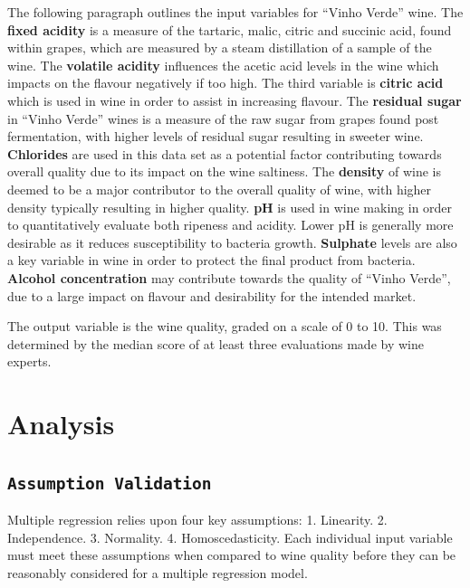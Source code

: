\documentclass[letterpaper,8pt,twocolumn,twoside,]{pinp}
\begin{document}
The following paragraph outlines the input variables for ``Vinho Verde''
wine. The \textbf{fixed acidity} is a measure of the tartaric, malic,
citric and succinic acid, found within grapes, which are measured by a
steam distillation of a sample of the wine. The \textbf{volatile
acidity} influences the acetic acid levels in the wine which impacts on
the flavour negatively if too high. The third variable is \textbf{citric
acid} which is used in wine in order to assist in increasing flavour.
The \textbf{residual sugar} in ``Vinho Verde'' wines is a measure of the
raw sugar from grapes found post fermentation, with higher levels of
residual sugar resulting in sweeter wine. \textbf{Chlorides} are used in
this data set as a potential factor contributing towards overall quality
due to its impact on the wine saltiness. The \textbf{density} of wine is
deemed to be a major contributor to the overall quality of wine, with
higher density typically resulting in higher quality. \textbf{pH} is
used in wine making in order to quantitatively evaluate both ripeness
and acidity. Lower pH is generally more desirable as it reduces
susceptibility to bacteria growth. \textbf{Sulphate} levels are also a
key variable in wine in order to protect the final product from
bacteria. \textbf{Alcohol concentration} may contribute towards the
quality of ``Vinho Verde'', due to a large impact on flavour and
desirability for the intended market.

The output variable is the wine quality, graded on a scale of 0 to 10.
This was determined by the median score of at least three evaluations
made by wine experts.

\hypertarget{analysis}{%
\section{Analysis}\label{analysis}}

\hypertarget{assumption-validation}{%
\subsection{\texorpdfstring{\texttt{Assumption\ Validation}}{Assumption Validation}}\label{assumption-validation}}

Multiple regression relies upon four key assumptions: 1. Linearity. 2.
Independence. 3. Normality. 4. Homoscedasticity. Each individual input
variable must meet these assumptions when compared to wine quality
before they can be reasonably considered for a multiple regression
model.
\end{document}
